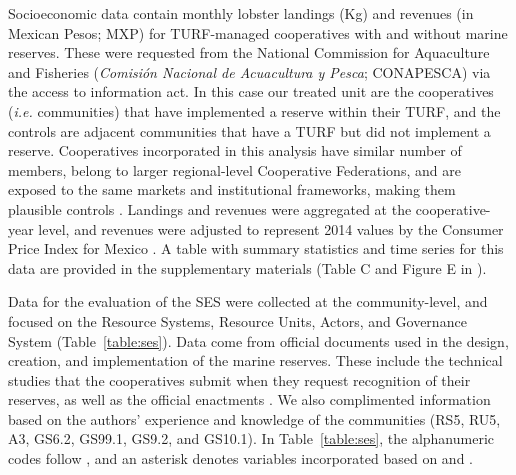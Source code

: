 \documentclass[10pt,letterpaper]{article}
\begin{document}
Socioeconomic data contain monthly lobster landings (Kg) and revenues (in Mexican Pesos; MXP) for TURF-managed cooperatives with and without marine reserves. These were requested from the National Commission for Aquaculture and Fisheries (\emph{Comisión Nacional de Acuacultura y Pesca}; CONAPESCA) via the access to information act. In this case our treated unit are the cooperatives (\emph{i.e.} communities) that have implemented a reserve within their TURF, and the controls are adjacent communities that have a TURF but did not implement a reserve. Cooperatives incorporated in this analysis have similar number of members, belong to larger regional-level Cooperative Federations, and are exposed to the same markets and institutional frameworks, making them plausible controls \cite{mccay_2014,mccay_2017,ayer_2018}. Landings and revenues were aggregated at the cooperative-year level, and revenues were adjusted to represent 2014 values by the Consumer Price Index for Mexico \cite{oecd_2017}. A table with summary statistics and time series for this data are provided in the supplementary materials (Table C and Figure E in ).

Data for the evaluation of the SES were collected at the community-level, and focused on the Resource Systems, Resource Units, Actors, and Governance System (Table~\ref{table:ses}). Data come from official documents used in the design, creation, and implementation of the marine reserves. These include the technical studies that the cooperatives submit when they request recognition of their reserves, as well as the official enactments \cite{dof_website_2012,dof_website_2013,dof_website_2018}. We also complimented information based on the authors' experience and knowledge of the communities (RS5, RU5, A3, GS6.2, GS99.1, GS9.2, and GS10.1). In Table~\ref{table:ses}, the alphanumeric codes follow \cite{basurto_2013-oq}, and an asterisk denotes variables incorporated based on \cite{difranco_2016-Xw} and \cite{edgar_2014-UO}.
\end{document}
